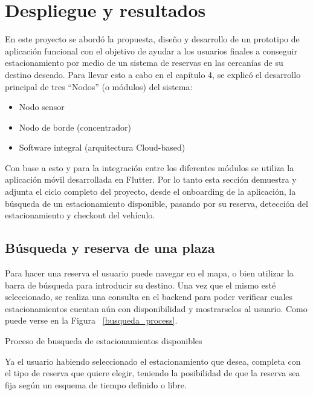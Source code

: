\clearpage
\section{Despliegue y resultados}{\label{title:resultados}}
En este proyecto se abordó la propuesta, diseño y desarrollo de un prototipo de aplicación funcional con el objetivo de ayudar a los usuarios finales a conseguir estacionamiento por medio de un sistema de reservas en las cercanías de su destino deseado.
Para llevar esto a cabo en el capítulo 4, se explicó el desarrollo principal de tres “Nodos” (o módulos) del sistema:

\begin{itemize}
    \item Nodo sensor
    \item Nodo de borde (concentrador)
    \item Software integral (arquitectura Cloud-based)
\end{itemize}

Con base a esto y para la integración entre los diferentes módulos se utiliza la aplicación móvil desarrollada en Flutter. Por lo tanto esta sección demuestra y adjunta el ciclo completo del proyecto, desde el onboarding de la aplicación, la búsqueda de un estacionamiento disponible, pasando por su reserva, detección del estacionamiento y checkout del vehículo.
\subsection{Búsqueda y reserva de una plaza}
Para hacer una reserva el usuario puede navegar en el mapa, o bien utilizar la barra de búsqueda para introducir su destino. Una vez que el mismo esté seleccionado, se realiza una consulta en el backend para poder verificar cuales estacionamientos cuentan aún con disponibilidad y mostrarselos al usuario. Como puede verse en la Figura ~\ref{busqueda_process}.

\begin{images}[\label{busqueda_process}]{Proceso de busqueda de estacionamientos disponibles}
\end{images}

Ya el usuario habiendo seleccionado el estacionamiento que desea, completa con el tipo de reserva que quiere elegir, teniendo la posibilidad de que la reserva sea fija según un esquema de tiempo definido o libre.

